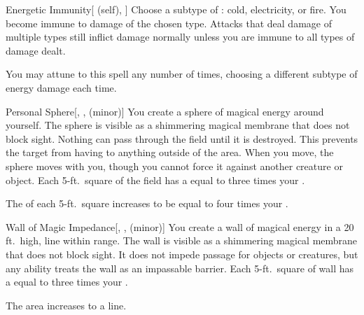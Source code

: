 \lowercase{\hypertarget{spell:Energetic Immunity}{}}\label{spell:Energetic Immunity}
\begin{attuneability}[Rank 5]{\hypertarget{spell:Energetic Immunity}{Energetic Immunity}}[ (self), ]
Choose a subtype of : cold, electricity, or fire.
You become immune to damage of the chosen type.
Attacks that deal damage of multiple types still inflict damage normally unless you are immune to all types of damage dealt.

\rankline
{} You may attune to this spell any number of times, choosing a different subtype of energy damage each time.
\end{attuneability}
\vspace{0.25em}



\lowercase{\hypertarget{spell:Personal Sphere}{}}\label{spell:Personal Sphere}
\begin{freeability}[Rank 5]{\hypertarget{spell:Personal Sphere}{Personal Sphere}}[, ,  (minor)]
You create a sphere of magical energy around yourself.
The sphere is visible as a shimmering magical membrane that does not block sight.
Nothing can pass through the field until it is destroyed.
This prevents the target from having  to anything outside of the area.
When you move, the sphere moves with you, though you cannot force it against another creature or object.
Each 5-ft.\ square of the field has a  equal to three times your .

\rankline
{} The  of each 5-ft.\ square increases to be equal to four times your .
\end{freeability}
\vspace{0.25em}



\lowercase{\hypertarget{spell:Wall of Magic Impedance}{}}\label{spell:Wall of Magic Impedance}
\begin{freeability}[Rank 5]{\hypertarget{spell:Wall of Magic Impedance}{Wall of Magic Impedance}}[, ,  (minor)]
\targetrule
You create a wall of magical energy in a 20 ft.\ high, \areamed line within \rngmed range.
The wall is visible as a shimmering magical membrane that does not block sight.
It does not impede passage for objects or creatures, but any  ability treats the wall as an impassable barrier.
Each 5-ft.\ square of wall has a  equal to three times your .

\rankline
{} The area increases to a \arealarge line.
\end{freeability}
\vspace{0.25em}



